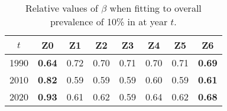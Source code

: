 \begin{table}
  \caption{Relative values of $\beta$ when fitting to overall prevalence of 10\% in at year $t$.}
  \centering
  \begin{tabular}{cccccccc}
  	\toprule
  	$t$  &      Z0       &  Z1  &  Z2  &  Z3  &  Z4  &  Z5  &      Z6       \\
  	\midrule
  	1990 & \textbf{0.64} & 0.72 & 0.70 & 0.71 & 0.70 & 0.71 & \textbf{0.69} \\
  	2010 & \textbf{0.82} & 0.59 & 0.59 & 0.59 & 0.60 & 0.59 & \textbf{0.61} \\
  	2020 & \textbf{0.93} & 0.61 & 0.62 & 0.59 & 0.64 & 0.62 & \textbf{0.68} \\
  	\bottomrule
  \end{tabular}
\end{table}